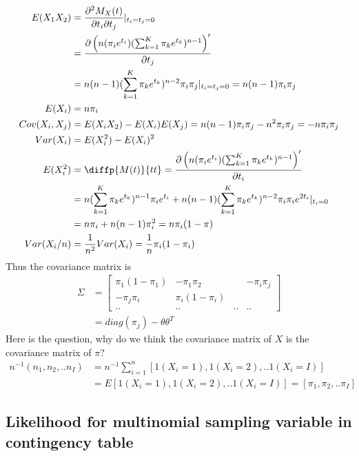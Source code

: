 	\begin{align*}
		E(X_1 X_2) &= \frac{\partial^2 M_X(t)}{\partial t_i \partial t_j}|_{t_i = t_j = 0}\\
		&= \frac{\partial \left(n(\pi_ie^{t_i})(\sum_{k=1}^K \pi_ke^{t_k})^{n-1} \right)'}{\partial t_j}\\
		&= n(n-1)(\sum_{k=1}^K \pi_ke^{t_k})^{n-2}\pi_i\pi_j|_{t_i = t_j = 0} = n(n-1)\pi_i\pi_j\\
		E(X_i) &= n\pi_i\\
		Cov(X_i, X_j) &= E(X_i X_2) - E(X_i)E(X_j) = n(n-1)\pi_i\pi_j - n^2 \pi_i\pi_j = -n\pi_i\pi_j\\
		Var(X_i) &= E(X_i^2) - E(X_i)^2 \\
		E(X_i^2) &= \diffp{M(t)}{t t} = \frac{\partial \left(n(\pi_ie^{t_i})(\sum_{k=1}^K \pi_ke^{t_k})^{n-1} \right)'}{\partial t_i}\\
		&= n(\sum_{k=1}^K \pi_ke^{t_k})^{n-1}\pi_i e^{t_i}+ n(n-1)(\sum_{k=1}^K \pi_ke^{t_k})^{n-2}\pi_i\pi_i e^{2t_i}|_{t_i = 0} \\
		&= n\pi_i + n(n-1)\pi_i^2 = n\pi_i(1-\pi)\\
		Var(X_i/n) &= \frac{1}{n^2} Var(X_i) = \frac{1}{n}\pi_i(1-\pi_i)
	\end{align*}
	Thus the covariance matrix is
	\begin{align*}
		\Sigma &= \begin{bmatrix}
			\pi_1(1-\pi_1) &  -\pi_1\pi_2&  & -\pi_i\pi_j \\
			-\pi_j\pi_i&  \pi_i(1-\pi_i)&   &  \\
			..& ..&..&..
		\end{bmatrix}\\
		&= diag{(\pi_j) - \theta \theta^T}
	\end{align*}
	Here is the question, why do we think the covariance matrix of $X$ is the covariance matrix of $\pi$?
	\begin{align*}
		n^{-1} (n_1, n_2, ..n_I) &= n^{-1} \sum_{i=1}^n[ 1 (X_{i}=1), 1 (X_{i}=2), ..1 (X_{i}=I)] \\
		&= E[1 (X_{i}=1), 1 (X_{i}=2), ..1 (X_{i}=I) ] = [\pi_1, \pi_2, .. \pi_I] 
	\end{align*}
	\subsection{Likelihood for multinomial sampling variable in contingency table}
	
